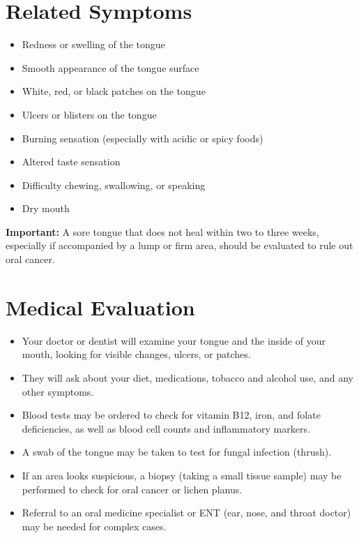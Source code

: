\section*{Related Symptoms}
\begin{itemize}
  \item Redness or swelling of the tongue
  \item Smooth appearance of the tongue surface
  \item White, red, or black patches on the tongue
  \item Ulcers or blisters on the tongue
  \item Burning sensation (especially with acidic or spicy foods)
  \item Altered taste sensation
  \item Difficulty chewing, swallowing, or speaking
  \item Dry mouth
\end{itemize}
\textbf{Important:} A sore tongue that does not heal within two to three weeks, especially if accompanied by a lump or firm area, should be evaluated to rule out oral cancer.

\section*{Medical Evaluation}
\begin{itemize}
  \item Your doctor or dentist will examine your tongue and the inside of your mouth, looking for visible changes, ulcers, or patches.
  \item They will ask about your diet, medications, tobacco and alcohol use, and any other symptoms.
  \item Blood tests may be ordered to check for vitamin B12, iron, and folate deficiencies, as well as blood cell counts and inflammatory markers.
  \item A swab of the tongue may be taken to test for fungal infection (thrush).
  \item If an area looks suspicious, a biopsy (taking a small tissue sample) may be performed to check for oral cancer or lichen planus.
  \item Referral to an oral medicine specialist or ENT (ear, nose, and throat doctor) may be needed for complex cases.
\end{itemize}

